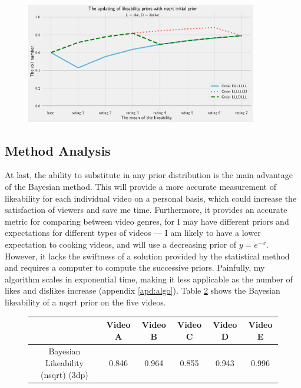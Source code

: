 \documentclass[a4paper,11pt]{article}
\begin{document}
\begin{figure}[H]
    \centering
    \includegraphics[width=0.9\textwidth]{assets/nsqrt_incre.png}
    \caption{}
    \label{fig:nsqrt_incre}
\end{figure}

\subsection{Method Analysis}
At last, the ability to substitute in any prior distribution is the main advantage of the Bayesian method. This will provide a more accurate measurement of likeability for each individual video on a personal basis, which could increase the satisfaction of viewers and save me time. Furthermore, it provides an accurate metric for comparing between video genres, for I may have different priors and expectations for different types of videos --- I am likely to have a lower expectation to cooking videos, and will use a decreasing prior of $y=e^{-x}$. However, it lacks the swiftness of a solution provided by the statistical method and requires a computer to compute the successive priors. Painfully, my algorithm scales in exponential time, making it less applicable as the number of likes and dislikes increase (appendix \ref{apd:algo}). Table \ref{tbl:baye} shows the Bayesian likeability of a nqsrt prior on the five videos.

\begin{figure}[H]
    \centering
    \begin{tabular}{c|c|c|c|c|c}
        & Video A & Video B & Video C & Video D & Video E \\
        \hline
        \hline
        Bayesian Likeability (nsqrt) (3dp) & 0.846 & 0.964 & 0.855 & 0.943 & 0.996
    \end{tabular}
    \label{tbl:baye}
\end{figure}
\end{document}
